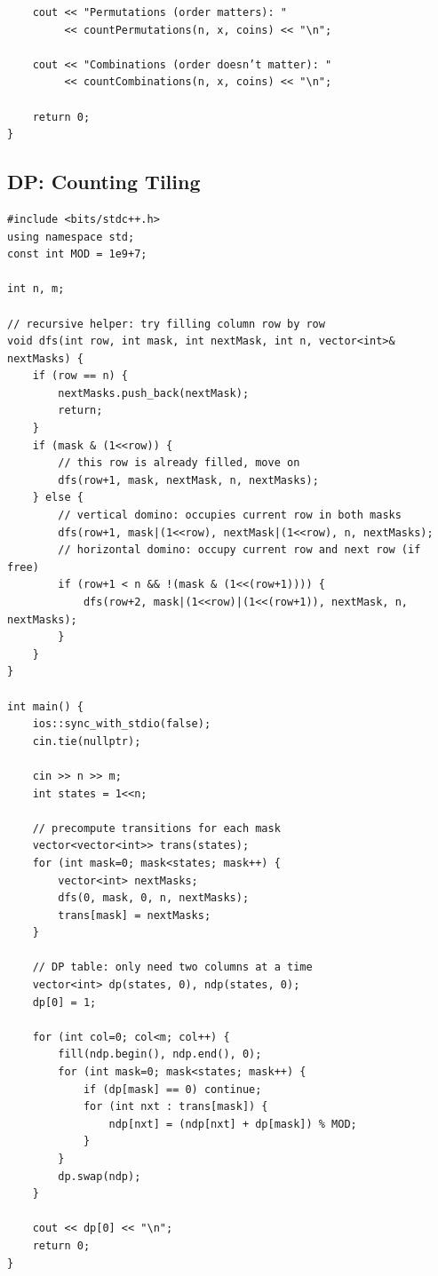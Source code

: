 \documentclass[a4paper,10pt,oneside]{article}
\begin{document}
\begin{multicols*}{\COLS}
\begin{lstlisting}
    cout << "Permutations (order matters): "
         << countPermutations(n, x, coins) << "\n";

    cout << "Combinations (order doesn’t matter): "
         << countCombinations(n, x, coins) << "\n";

    return 0;
}

\end{lstlisting}
\subsection{DP: Counting Tiling}
\begin{lstlisting}
#include <bits/stdc++.h>
using namespace std;
const int MOD = 1e9+7;

int n, m;

// recursive helper: try filling column row by row
void dfs(int row, int mask, int nextMask, int n, vector<int>& nextMasks) {
    if (row == n) {
        nextMasks.push_back(nextMask);
        return;
    }
    if (mask & (1<<row)) {
        // this row is already filled, move on
        dfs(row+1, mask, nextMask, n, nextMasks);
    } else {
        // vertical domino: occupies current row in both masks
        dfs(row+1, mask|(1<<row), nextMask|(1<<row), n, nextMasks);
        // horizontal domino: occupy current row and next row (if free)
        if (row+1 < n && !(mask & (1<<(row+1)))) {
            dfs(row+2, mask|(1<<row)|(1<<(row+1)), nextMask, n, nextMasks);
        }
    }
}

int main() {
    ios::sync_with_stdio(false);
    cin.tie(nullptr);

    cin >> n >> m;
    int states = 1<<n;

    // precompute transitions for each mask
    vector<vector<int>> trans(states);
    for (int mask=0; mask<states; mask++) {
        vector<int> nextMasks;
        dfs(0, mask, 0, n, nextMasks);
        trans[mask] = nextMasks;
    }

    // DP table: only need two columns at a time
    vector<int> dp(states, 0), ndp(states, 0);
    dp[0] = 1;

    for (int col=0; col<m; col++) {
        fill(ndp.begin(), ndp.end(), 0);
        for (int mask=0; mask<states; mask++) {
            if (dp[mask] == 0) continue;
            for (int nxt : trans[mask]) {
                ndp[nxt] = (ndp[nxt] + dp[mask]) % MOD;
            }
        }
        dp.swap(ndp);
    }

    cout << dp[0] << "\n";
    return 0;
}



\end{lstlisting}
\end{multicols*}
\end{document}
